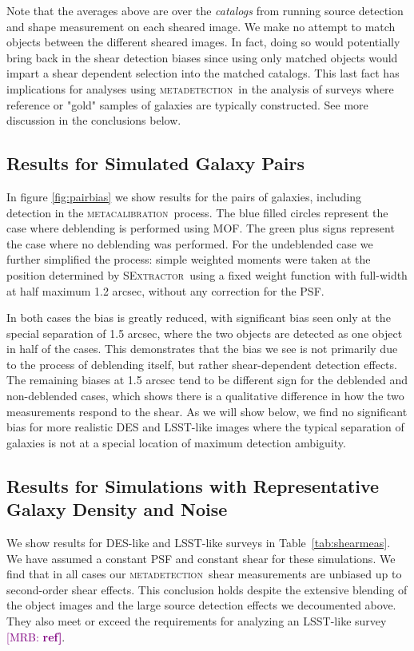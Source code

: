 \documentclass[fleqn,useAMS,usenatbib]{mnras}
\newcommand{\mrb}[1]{\textcolor{purple}{[MRB: \bf #1]}}
\newcommand{\mcal}{\textsc{metacalibration}}
\newcommand{\mdet}{\textsc{metadetection}}
\newcommand{\sx}{\textsc{SExtractor}}
\begin{document}
Note that the averages above are over the {\it catalogs} from running source detection
and shape measurement on each sheared image. We make no attempt to match objects between the different
sheared images. In fact, doing so would potentially bring back in the shear
detection biases since using only matched objects would impart a shear dependent
selection into the matched catalogs. This last fact has implications for
analyses using \mdet\ in the analysis of surveys where reference or "gold"
samples of galaxies are typically constructed. See more discussion in the
conclusions below.

\subsection{Results for Simulated Galaxy Pairs}
\label{sec:mdetpairs}

In figure \ref{fig:pairbias} we show results for the pairs of galaxies, including
detection in the \mcal\ process. The blue filled circles represent the case
where deblending is performed using MOF. The green plus signs represent the
case where no deblending was performed. For the undeblended case we further
simplified the process: simple weighted moments were taken at the position
determined by \sx\ using a fixed weight function with full-width at half
maximum 1.2 arcsec, without any correction for the PSF.

In both cases the bias is greatly reduced, with significant bias seen only at
the special separation of 1.5 arcsec, where the two objects are detected as one
object in half of the cases. This demonstrates that the bias we see is not
primarily due to the process of deblending itself, but rather shear-dependent
detection effects. The remaining biases at 1.5 arcsec tend to be different
sign for the deblended and non-deblended cases, which shows there is a
qualitative difference in how the two measurements respond to the shear. As we
will show below, we find no significant bias for more realistic DES and
LSST-like images where the typical separation of galaxies is not at a special
location of maximum detection ambiguity.

\subsection{Results for Simulations with Representative Galaxy Density and Noise}
\label{sec:res:constpsf}

We show results for DES-like and LSST-like surveys in Table~\ref{tab:shearmeas}.
We have assumed a constant PSF and constant shear for these simulations. We find
that in all cases our \mdet\ shear measurements are unbiased up to
second-order shear effects. This conclusion holds despite the extensive blending
of the object images and the large source detection effects we decoumented
above. They also meet or exceed the requirements for analyzing an LSST-like survey
\mrb{ref}.
\end{document}
